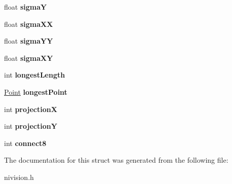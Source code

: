 \begin{DoxyCompactItemize}
\item 
\hypertarget{structParticleReport__struct_a2a5f2d03144f772a27375934b74e5e0a}{
float {\bfseries sigmaY}}
\label{structParticleReport__struct_a2a5f2d03144f772a27375934b74e5e0a}

\item 
\hypertarget{structParticleReport__struct_accee62e007be8a3fdd51c158c3621efd}{
float {\bfseries sigmaXX}}
\label{structParticleReport__struct_accee62e007be8a3fdd51c158c3621efd}

\item 
\hypertarget{structParticleReport__struct_a845e4d4a64e40fc7ae8e41dc06eaca75}{
float {\bfseries sigmaYY}}
\label{structParticleReport__struct_a845e4d4a64e40fc7ae8e41dc06eaca75}

\item 
\hypertarget{structParticleReport__struct_a0e8763cbd7dc6b757056c92671a854cf}{
float {\bfseries sigmaXY}}
\label{structParticleReport__struct_a0e8763cbd7dc6b757056c92671a854cf}

\item 
\hypertarget{structParticleReport__struct_add5a830082fa191e6e4645246de2ec8a}{
int {\bfseries longestLength}}
\label{structParticleReport__struct_add5a830082fa191e6e4645246de2ec8a}

\item 
\hypertarget{structParticleReport__struct_aa79d31c7062140ee3a692e5f5195e6df}{
\hyperlink{structPoint__struct}{Point} {\bfseries longestPoint}}
\label{structParticleReport__struct_aa79d31c7062140ee3a692e5f5195e6df}

\item 
\hypertarget{structParticleReport__struct_a4649df82483113e98bc0e88ce14ea212}{
int {\bfseries projectionX}}
\label{structParticleReport__struct_a4649df82483113e98bc0e88ce14ea212}

\item 
\hypertarget{structParticleReport__struct_ab6426e0afd854df2b4d268ee0ca5dcf8}{
int {\bfseries projectionY}}
\label{structParticleReport__struct_ab6426e0afd854df2b4d268ee0ca5dcf8}

\item 
\hypertarget{structParticleReport__struct_ac8af75154678c1c4bc3b3952ca2d6ede}{
int {\bfseries connect8}}
\label{structParticleReport__struct_ac8af75154678c1c4bc3b3952ca2d6ede}

\end{DoxyCompactItemize}


The documentation for this struct was generated from the following file:\begin{DoxyCompactItemize}
\item 
nivision.h\end{DoxyCompactItemize}
